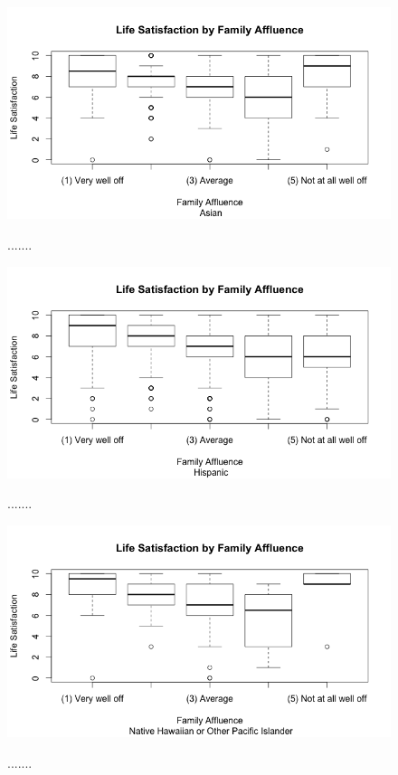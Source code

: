 \documentclass[12pt]{article}
\begin{document}
\begin{figure}[hptb]
	\centering
{\includegraphics[scale=0.45]{boxplotasian.png}} \;
\caption{.......}
	\label{fig:img}
\end{figure}

\begin{figure}[hptb]
	\centering
{\includegraphics[scale=0.45]{boxplothispanic.png}} \;
\caption{.......}
	\label{fig:img}
\end{figure}

\begin{figure}[hptb]
	\centering
{\includegraphics[scale=0.45]{boxplotislander.png}} \;
\caption{.......}
	\label{fig:img}
\end{figure}
\end{document}
